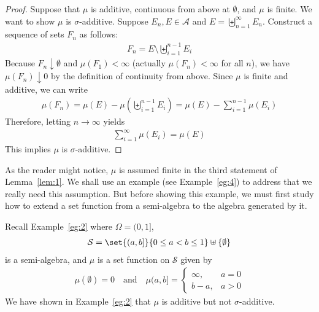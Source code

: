 \documentclass[thmcnt=section, 12pt, color=purple]{my-elegantbook}
\begin{document}
\begin{proof}
	Suppose that $\mu$ is additive,
	continuous from above at $\emptyset$,
	and $\mu$ is finite.
	We want to show $\mu$ is $\sigma$-additive.
	Suppose $E_n, E \in \mathcal{A}$ 
	and $E = \biguplus_{n=1}^\infty E_n$.
	Construct a sequence of sets $F_n$ as follows:
	\begin{align*}
		F_n = E \setminus \biguplus_{i=1}^{n-1} E_i
	\end{align*}
	Because $F_n \downarrow \emptyset$
	and $\mu(F_1) < \infty$ (actually $\mu(F_n) < \infty$ for all $n$),
	we have $\mu(F_n) \downarrow 0$
	by the definition of continuity from above.
	Since $\mu$ is finite and additive, we can write 
	\begin{align*}
		\mu(F_n) = \mu(E) - \mu(\biguplus_{i=1}^{n-1} E_i)
		= \mu(E) - \sum_{i=1}^{n-1} \mu (E_i)
	\end{align*}
	Therefore, letting $n \to \infty$ yields 
	\begin{align*}
		\sum_{i=1}^\infty \mu(E_i) = \mu(E)
	\end{align*}
	This implies $\mu$ is $\sigma$-additive.
\end{proof}

As the reader might notice, $\mu$ is assumed finite
in the third statement of Lemma~\ref{lem:1}.
We shall use an example (see Example~\ref{eg:4}) to address that
we really need this assumption.
But before showing this example, 
we must first study how to extend a set function 
from a semi-algebra to the algebra generated by it.


\begin{example} \label{eg:4}
	Recall Example~\ref{eg:2}
	where $\Omega = (0, 1]$,
	\begin{align*}
		\mathcal{S} = \set{(a, b]}{0 \leq a < b \leq 1}
		\uplus \{\emptyset\}
	\end{align*}
	is a semi-algebra, and $\mu$ is a set function 
	on $\mathcal{S}$ given by 
	\begin{align*}
		\mu (\emptyset) = 0
		\quad \text{and} \quad
		\mu (a, b] = \begin{cases}
			\infty,
			&a=0 \\
			b - a,
			&a > 0
		\end{cases}
	\end{align*}
	We have shown in Example~\ref{eg:2} that $\mu$ is additive
	but not $\sigma$-additive.
\end{example}
\end{document}
